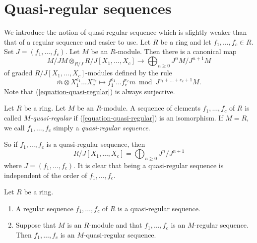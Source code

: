 \section{Quasi-regular sequences}
\label{section-quasi-regular}

\noindent
We introduce the notion of quasi-regular sequence which is slightly weaker
than that of a regular sequence and easier to use.
Let $R$ be a ring and let $f_1, \ldots, f_c \in R$.
Set $J = (f_1, \ldots, f_c)$. Let $M$ be an $R$-module.
Then there is a canonical map
\begin{equation}
\label{equation-quasi-regular}
M/JM \otimes_{R/J} R/J[X_1, \ldots, X_c]
\longrightarrow
\bigoplus\nolimits_{n \geq 0} J^nM/J^{n + 1}M
\end{equation}
of graded $R/J[X_1, \ldots, X_c]$-modules defined by the rule
$$
\overline{m} \otimes X_1^{e_1} \ldots X_c^{e_c} \longmapsto
f_1^{e_1} \ldots f_c^{e_c} m \bmod J^{e_1 + \ldots + e_c + 1}M.
$$
Note that (\ref{equation-quasi-regular}) is always surjective.

\begin{definition}
\label{definition-quasi-regular-sequence}
Let $R$ be a ring.
Let $M$ be an $R$-module.
A sequence of elements $f_1, \ldots, f_c$ of $R$ is called
{\it $M$-quasi-regular} if (\ref{equation-quasi-regular})
is an isomorphism. If $M = R$, we call $f_1, \ldots, f_c$ simply a
{\it quasi-regular sequence}.
\end{definition}

\noindent
So if $f_1, \ldots, f_c$ is a quasi-regular sequence, then
$$
R/J[X_1, \ldots, X_c] = \bigoplus\nolimits_{n \geq 0} J^n/J^{n + 1}
$$
where $J = (f_1, \ldots, f_c)$. It is clear that being a quasi-regular
sequence is independent of the order of $f_1, \ldots, f_c$.

\begin{lemma}
\label{lemma-regular-quasi-regular}
Let $R$ be a ring.
\begin{enumerate}
\item A regular sequence $f_1, \ldots, f_c$ of $R$ is a quasi-regular
sequence.
\item Suppose that $M$ is an $R$-module and that $f_1, \ldots, f_c$
is an $M$-regular sequence. Then $f_1, \ldots, f_c$ is an
$M$-quasi-regular sequence.
\end{enumerate}
\end{lemma}


